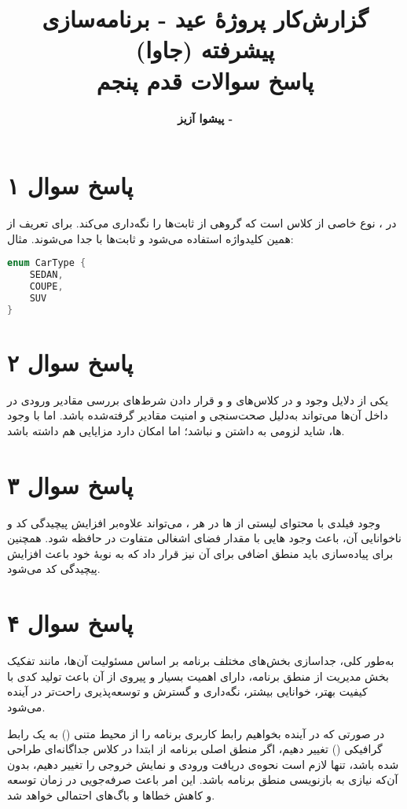 \documentclass{article}
\title{\textbf{گزارش‌کار پروژۀ عید - برنامه‌سازی پیشرفته (جاوا)}\vspace{1cm}\\پاسخ سوالات قدم پنجم}
\author{\textbf{پیشوا آزیز - \lr{40313003}}}
\date{}
\begin{document}
\maketitle

\vspace{2cm}

\section*{پاسخ سوال ۱}
در ،  نوع خاصی از کلاس است که گروهی از ثابت‌ها را نگه‌داری می‌کند. برای تعریف  از همین کلیدواژه استفاده می‌شود و ثابت‌ها با  جدا می‌شوند. مثال:

\begin{latin}
\begin{lstlisting}[language=Java]
enum CarType {
    SEDAN,
    COUPE,
    SUV
}
\end{lstlisting}
\end{latin}

\section*{پاسخ سوال ۲}
یکی از دلایل وجود  و  در کلاس‌های  و  و قرار دادن شرط‌های بررسی مقادیر ورودی در داخل آن‌ها می‌تواند به‌دلیل صحت‌سنجی و امنیت مقادیر گرفته‌شده باشد. اما با وجود ها، شاید لزومی به داشتن  و  نباشد؛ اما امکان دارد مزایایی هم داشته باشد.

\section*{پاسخ سوال ۳}
وجود فیلدی با محتوای لیستی از ها در هر ، می‌تواند علاوه‌بر افزایش پیچیدگی کد و ناخوانایی آن، باعث وجود هایی با مقدار فضای اشغالی متفاوت در حافظه شود. همچنین برای پیاده‌سازی  باید منطق اضافی برای آن نیز قرار داد که به نوبۀ خود باعث افزایش پیچیدگی کد می‌شود.

\section*{پاسخ سوال ۴}
به‌طور کلی، جداسازی بخش‌های مختلف برنامه بر اساس مسئولیت آن‌ها، مانند تفکیک بخش مدیریت  از منطق برنامه، دارای اهمیت بسیار و پیروی از آن باعث تولید کدی با کیفیت بهتر، خوانایی بیشتر، نگه‌داری و گسترش و توسعه‌پذیری راحت‌تر در آینده می‌شود.

در صورتی که در آینده بخواهیم رابط کاربری برنامه را از محیط متنی () به یک رابط گرافیکی () تغییر دهیم، اگر منطق اصلی برنامه از ابتدا در کلاس جداگانه‌ای طراحی شده باشد، تنها لازم است نحوه‌ی دریافت ورودی و نمایش خروجی را تغییر دهیم، بدون آن‌که نیازی به بازنویسی منطق برنامه باشد. این امر باعث صرفه‌جویی در زمان توسعه و کاهش خطاها و باگ‌های احتمالی خواهد شد.
\end{document}

